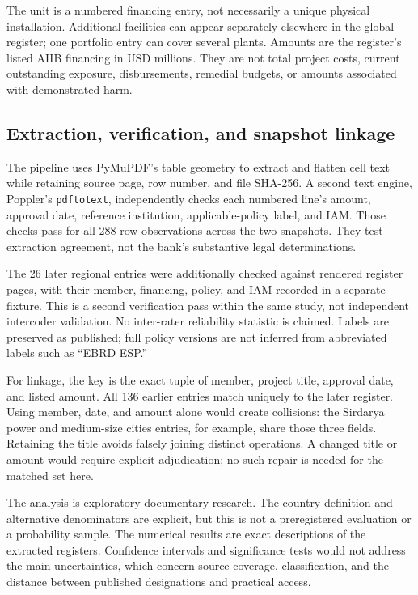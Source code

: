\documentclass[11pt,a4paper]{article}
\begin{document}
The unit is a numbered financing entry, not necessarily a unique physical installation. Additional facilities can appear separately elsewhere in the global register; one portfolio entry can cover several plants. Amounts are the register's listed AIIB financing in USD millions. They are not total project costs, current outstanding exposure, disbursements, remedial budgets, or amounts associated with demonstrated harm.

\subsection{Extraction, verification, and snapshot linkage}
The pipeline uses PyMuPDF's table geometry to extract and flatten cell text while retaining source page, row number, and file SHA-256. A second text engine, Poppler's \texttt{pdftotext}, independently checks each numbered line's amount, approval date, reference institution, applicable-policy label, and IAM. Those checks pass for all 288 row observations across the two snapshots. They test extraction agreement, not the bank's substantive legal determinations.

The 26 later regional entries were additionally checked against rendered register pages, with their member, financing, policy, and IAM recorded in a separate fixture. This is a second verification pass within the same study, not independent intercoder validation. No inter-rater reliability statistic is claimed. Labels are preserved as published; full policy versions are not inferred from abbreviated labels such as ``EBRD ESP.''

For linkage, the key is the exact tuple of member, project title, approval date, and listed amount. All 136 earlier entries match uniquely to the later register. Using member, date, and amount alone would create collisions: the Sirdarya power and medium-size cities entries, for example, share those three fields. Retaining the title avoids falsely joining distinct operations. A changed title or amount would require explicit adjudication; no such repair is needed for the matched set here.

The analysis is exploratory documentary research. The country definition and alternative denominators are explicit, but this is not a preregistered evaluation or a probability sample. The numerical results are exact descriptions of the extracted registers. Confidence intervals and significance tests would not address the main uncertainties, which concern source coverage, classification, and the distance between published designations and practical access.
\end{document}

